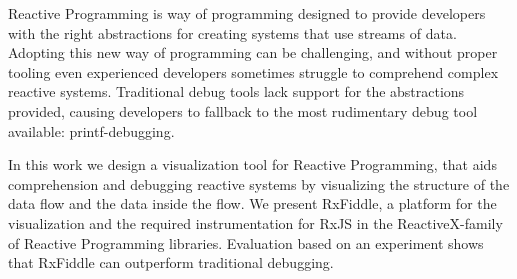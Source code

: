 Reactive Programming is way of programming designed to provide developers with the right abstractions for creating systems that use streams of data.
Adopting this new way of programming can be challenging, and without proper tooling even experienced developers sometimes struggle to comprehend complex reactive systems.
Traditional debug tools lack support for the abstractions provided, causing developers to fallback to the most rudimentary debug tool available: printf-debugging.

In this work we design a visualization tool for Reactive Programming, that aids comprehension and debugging reactive systems by visualizing the structure of the data flow and the data inside the flow.
We present RxFiddle, a platform for the visualization and the required instrumentation for RxJS in the ReactiveX-family of Reactive Programming libraries.
Evaluation based on an experiment shows that RxFiddle can outperform traditional debugging.
